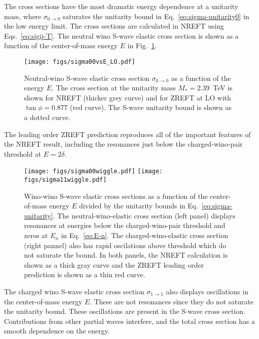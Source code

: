 \documentclass[%
 reprint,
 amsmath,amssymb,
 aps,
]{revtex4-1}
\begin{document}
The cross sections have the most dramatic energy dependence at a unitarity mass, where $\sigma_{0 \to 0}$ saturates the unitarity bound in Eq.~\eqref{eq:sigma-unitarity0} in the low energy limit.
The cross sections are calculated in NREFT using Eqs.~\eqref{eq:sigij-T}.
The neutral wino S-wave elastic cross section is shown as a function of the center-of-mass energy $E$ in Fig.~\ref{fig:sigma00vsE-LO}.
\begin{figure}[t]
\centering
\texttt{[image: figs/sigma00vsE\_LO.pdf]}
\caption{Neutral-wino S-wave elastic cross section $\sigma_{0 \to 0}$ as a function of the energy $E$. The cross section at the unitarity mass $M_*=2.39$~TeV is shown for NREFT (thicker grey curve) and for ZREFT at LO with $\tan \phi = 0.877$ (red curve). The S-wave unitarity bound is shown as a dotted curve.}
\label{fig:sigma00vsE-LO}
\end{figure}
The leading order ZREFT prediction reproduces all of the important features of the NREFT result, including the resonances just below the charged-wino-pair threshold at $E=2\delta$.


\begin{figure}[t]
\centering
\texttt{[image: figs/sigma00wiggle.pdf]}
\texttt{[image: figs/sigma11wiggle.pdf]}
\caption{Wino-wino S-wave elastic cross sections as a function of the center-of-mass energy $E$ divided by the unitarity bounds in Eq.~\eqref{eq:sigma-unitarity}. The neutral-wino-elastic cross section (left panel) displays resonances at energies below the charged-wino-pair threshold and zeros at $E_n$ in Eq.~\eqref{eq:E-n}. The charged-wino-elastic cross section (right pannel) also has rapid oscilations above threshold which do not saturate the bound. In both panels, the NREFT calculation is shown as a thick gray curve and the ZREFT leading order prediction is shown as a thin red curve.}
\label{fig:elasticwiggles}
\end{figure}
The charged wino S-wave elastic cross section $\sigma_{1 \to 1}$ also displays oscillations in the center-of-mass energy $E$.
These are not resonances since they do not saturate the unitarity bound.
These oscillations are present in the S-wave cross section.
Contributions from other partial waves interfere, and the total cross section has a smooth dependence on the energy.
\end{document}

